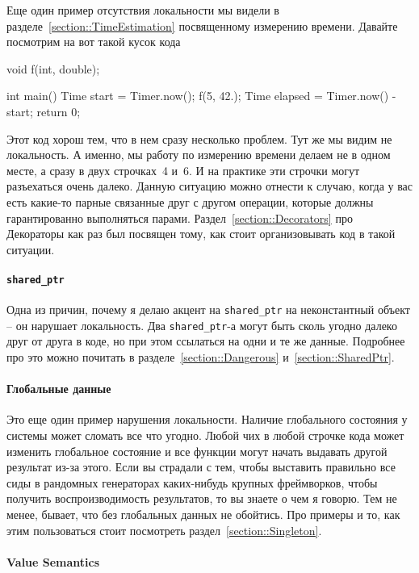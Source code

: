 Еще один пример отсутствия локальности мы видели в разделе~\ref{section::TimeEstimation} посвященному измерению времени.
Давайте посмотрим на вот такой кусок кода
\begin{cppcode}
void f(int, double);

int main() {
  Time start = Timer.now();
  f(5, 42.);
  Time elapsed = Timer.now() - start;
  return 0;
}
\end{cppcode}
Этот код хорош тем, что в нем сразу несколько проблем.
Тут же мы видим не локальность.
А именно, мы работу по измерению времени делаем не в одном месте, а сразу в двух строчках~4 и~6.
И на практике эти строчки могут разъехаться очень далеко.
Данную ситуацию можно отнести к случаю, когда у вас есть какие-то парные связанные друг с другом операции, которые должны гарантированно выполняться парами.
Раздел~\ref{section::Decorators} про Декораторы как раз был посвящен тому, как стоит организовывать код в такой ситуации.

\paragraph{\texttt{shared\_ptr}}

Одна из причин, почему я делаю акцент на \texttt{shared\_ptr} на неконстантный объект -- он нарушает локальность.
Два \texttt{shared\_ptr}-а могут быть сколь угодно далеко друг от друга в коде, но при этом ссылаться на одни и те же данные.
Подробнее про это можно почитать в разделе~\ref{section::Dangerous} и~\ref{section::SharedPtr}.

\paragraph{Глобальные данные}

Это еще один пример нарушения локальности.
Наличие глобального состояния у системы может сломать все что угодно.
Любой чих в любой строчке кода может изменить глобальное состояние и все функции могут начать выдавать другой результат из-за этого.
Если вы страдали с тем, чтобы выставить правильно все сиды в рандомных генераторах каких-нибудь крупных фреймворков, чтобы получить воспроизводимость результатов, то вы знаете о чем я говорю.
Тем не менее, бывает, что без глобальных данных не обойтись.
Про примеры и то, как этим пользоваться стоит посмотреть раздел~\ref{section::Singleton}.

\paragraph{Value Semantics}

